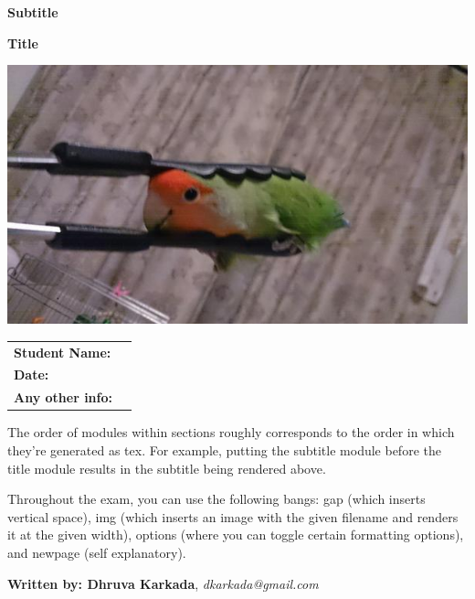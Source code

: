\documentclass{exam}
\begin{document}
\begin{coverpages}
		\vspace{0.00 in}
		\vspace{0.00 in}
	\begin{center}
		\vspace{0.05 in}
		\par\noindent\textbf{\large  Subtitle}
		\vspace{0.05 in}
		\vspace{0.10 in}
		\par\noindent\textbf{\Huge   Title}
		\vspace{0.5 in}
		\vspace{0.05 in}
		\par\noindent
				\includegraphics[width=.7\textwidth]{images/tong.jpg}
		\vspace{0.05 in}
		\vspace{0.5 in}
		\vspace{0.10 in}
		\vspace{0.15 in}
		\def\arraystretch{2}\tabcolsep=3pt
		\begin{tabular}{l r}
			\textbf{Student Name:} & \makebox[4in]{\hrulefill} \\
			\textbf{Date:} & \makebox[4in]{\hrulefill} \\
			\textbf{Any other info:} & \makebox[4in]{\hrulefill} \\
		\end{tabular}
		\vspace{0.15 in}
	\end{center}
		\vspace{0.15 in}
	\par The order of modules within sections roughly corresponds to the order in which they're generated as tex. For example, putting the subtitle module before the title module results in the subtitle being rendered above.
	\par Throughout the exam, you can use the following bangs: gap (which inserts vertical space), img (which inserts an image with the given filename and renders it at the given width), options (where you can toggle certain formatting options), and newpage (self explanatory).
		\vspace{0.15 in}
	\begin{center}
		\vspace{0.05 in}
		\par\noindent\textbf{Written by:  Dhruva Karkada}, \textit{ dkarkada@gmail.com}
		\vspace{0.05 in}
	\end{center}
\end{coverpages}
\end{document}
